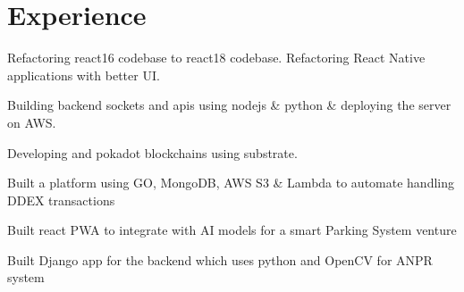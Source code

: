 \documentclass[]{deedy-resume-openfont}
\begin{document}
       \section{Experience}
       \hfill {}
           \begin{tightemize}
            \item Refactoring react16 codebase to react18 codebase. Refactoring React Native applications with better UI.
            \item Building backend sockets and apis using nodejs \& python \& deploying the server on AWS.
            \item Developing and pokadot blockchains using substrate.
           \end{tightemize}
           \sectionsep
       \hfill {}
           \begin{tightemize}
  \item Built a platform using GO, MongoDB, AWS S3 \& Lambda to automate handling DDEX transactions
\end{tightemize}
           \sectionsep
       \hfill {}
           \begin{tightemize}
  \item Built react PWA to integrate with AI models for a smart Parking System venture
  \item Built Django app for the backend which uses python and OpenCV for ANPR system
\end{tightemize}
           \sectionsep
%
%
%
%
\end{document}
